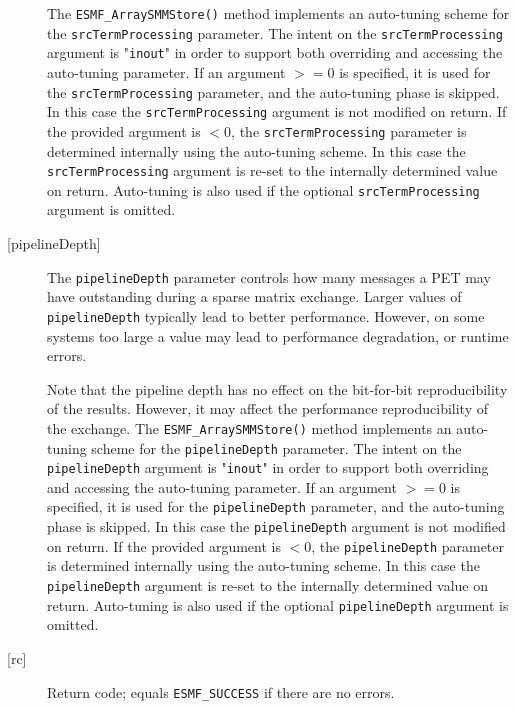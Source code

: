 \begin{description}
       \begin{sloppypar}
       The {\tt ESMF\_ArraySMMStore()} method implements an auto-tuning scheme
       for the {\tt srcTermProcessing} parameter. The intent on the
       {\tt srcTermProcessing} argument is "{\tt inout}" in order to
       support both overriding and accessing the auto-tuning parameter.
       If an argument $>= 0$ is specified, it is used for the
       {\tt srcTermProcessing} parameter, and the auto-tuning phase is skipped.
       In this case the {\tt srcTermProcessing} argument is not modified on
       return. If the provided argument is $< 0$, the {\tt srcTermProcessing}
       parameter is determined internally using the auto-tuning scheme. In this
       case the {\tt srcTermProcessing} argument is re-set to the internally
       determined value on return. Auto-tuning is also used if the optional
       {\tt srcTermProcessing} argument is omitted.
       \end{sloppypar}
  
     \item [{[pipelineDepth]}]
       The {\tt pipelineDepth} parameter controls how many messages a PET
       may have outstanding during a sparse matrix exchange. Larger values
       of {\tt pipelineDepth} typically lead to better performance. However,
       on some systems too large a value may lead to performance degradation,
       or runtime errors.
  
       Note that the pipeline depth has no effect on the bit-for-bit
       reproducibility of the results. However, it may affect the performance
       reproducibility of the exchange.
       The {\tt ESMF\_ArraySMMStore()} method implements an auto-tuning scheme
       for the {\tt pipelineDepth} parameter. The intent on the
       {\tt pipelineDepth} argument is "{\tt inout}" in order to
       support both overriding and accessing the auto-tuning parameter.
       If an argument $>= 0$ is specified, it is used for the
       {\tt pipelineDepth} parameter, and the auto-tuning phase is skipped.
       In this case the {\tt pipelineDepth} argument is not modified on
       return. If the provided argument is $< 0$, the {\tt pipelineDepth}
       parameter is determined internally using the auto-tuning scheme. In this
       case the {\tt pipelineDepth} argument is re-set to the internally
       determined value on return. Auto-tuning is also used if the optional
       {\tt pipelineDepth} argument is omitted.
  
     \item [{[rc]}]
       Return code; equals {\tt ESMF\_SUCCESS} if there are no errors.
  
   \end{description}
   
